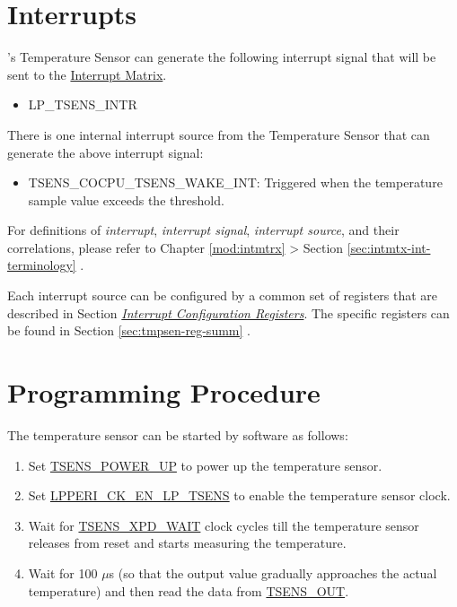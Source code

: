 \documentclass[main\_\_EN.tex]{subfiles}
\begin{document}

\section{Interrupts}

\chipname{}'s Temperature Sensor can generate the following interrupt signal that will be sent to the \hyperref[mod:intmtrx]{Interrupt Matrix}.

    \begin{itemize}
        \item LP\_TSENS\_INTR
    \end{itemize}

There is one internal interrupt source from the Temperature Sensor that can generate the above interrupt signal:

    \begin{itemize}
        \item TSENS\_COCPU\_TSENS\_WAKE\_INT\label{int:TSENSINT}: Triggered when the temperature sample value exceeds the threshold.
    \end{itemize}

\begin{tiplisting}
For definitions of \textit{interrupt}, \textit{interrupt signal}, \textit{interrupt source}, and their correlations, please refer to Chapter \ref{mod:intmtrx} \textit{} > Section \ref{sec:intmtx-int-terminology} \textit{}.
\end{tiplisting}

Each interrupt source can be configured by a common set of registers that are described in Section \hyperref[interrupt-config-registers]{\textit{Interrupt Configuration Registers}}. The specific registers can be found in Section \ref{sec:tmpsen-reg-summ} \textit{}.

\section{Programming Procedure}

The temperature sensor can be started by software as follows:
    \begin{enumerate}
        \item Set \hyperref[fielddesc:TSENSPOWERUP]{TSENS\_POWER\_UP} to power up the temperature sensor.
        \item Set \hyperref[fielddesc:LPPERICKENLPTSENS]{LPPERI\_CK\_EN\_LP\_TSENS} to enable the temperature sensor clock.
        \item Wait for \hyperref[fielddesc:TSENSXPDWAIT]{TSENS\_XPD\_WAIT} clock cycles till the temperature sensor releases from reset and starts measuring the temperature.
        \item Wait for 100 $\mu$s (so that the output value gradually approaches the actual temperature) and then read the data from \hyperref[fielddesc:TSENSOUT]{TSENS\_OUT}.
    \end{enumerate}
\end{document}
